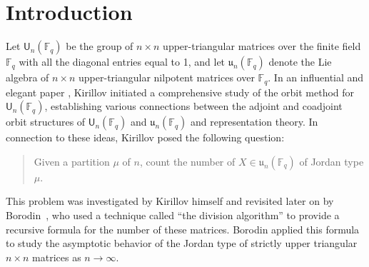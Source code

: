 \documentclass[12pt,a4paper,reqno]{amsart}
\theoremstyle{plain}
\theoremstyle{definition}
\newcommand{\FF}{{\mathbb{F}}}
\newcommand{\1}{\mathds{1}}
\newcommand{\GL}{\mathrm{GL}}
\renewcommand{\u}{\mathfrak{u}}
\newcommand{\U}{\mathsf{U}}
\begin{document}
\begin{abstract}
We give three applications of our main result stated above. 
First, we obtain an analogous formula for the number of points of a nilpotent Hessenberg variety. 
Second, we give an explicit formula for the number of  $X\in \u_\Lambda(\FF_q)$ that satisfy $X^2=0$. In the special case $\Lambda=(1^n)$, our formula is different from the one conjectured by Kirillov and Melnikov~\cite{KirillovMelnikov} (and proved by Ekhad and Zeilberger~\cite{Ekhad}). However, we obtain a new proof of the Kirillov-Melnikov-Ekhad-Zeilberger 
formula
using our latter result and a formula for two-rowed Macdonald polynomials by Jing and J\'{o}zefiak~\cite{Jing}.
As a byproduct, we demonstrate that a recurrence relation of Kirillov in~\cite{KirillovX=0} for the number of strictly upper triangular matrices of Jordan type $\mu$ is a straightforward consequence of our main results combined with the Cauchy identity for Macdonald polynomials.
Third, we give an explicit formula for the number of double cosets $\U_1\backslash\GL_n(\FF_q)/\U_2$ where $\U_1$ and $\U_2$ denote unipotent subgroups of $\GL_n(\FF_q)$ that correspond to two $\mathfrak b_n(\FF_q)$-stable ideals of $\u_n(\FF_q)$. 
\end{abstract}


\section{Introduction}

Let $\U_n(\mathbb{F}_q)$ be the group of $n \times n$ upper-triangular matrices over the finite field $\mathbb{F}_q$ with all the diagonal entries equal to 1, and let $\mathfrak{u}_n(\mathbb{F}_q)$ denote the Lie algebra of $n \times n$ upper-triangular nilpotent matrices over $\mathbb{F}_q$. In an influential and elegant paper 
\cite{Kirillov}, Kirillov initiated a comprehensive study of the orbit method for $\U_n(\mathbb{F}_q)$, establishing various connections between the adjoint and coadjoint orbit structures of 
$\U_n(\mathbb{F}_q)$ and
$\mathfrak{u}_n(\mathbb{F}_q)$ 
and representation theory. 
In connection to these ideas, Kirillov posed the following question:
\medskip
\begin{quote}
Given a partition $\mu$ of $n$, count the number of  $X\in \mathfrak{u}_n(\mathbb{F}_q)$ of Jordan type  $\mu$.
\end{quote}
\medskip

This problem was investigated by Kirillov himself and revisited later on by Borodin~\cite{Borodin}, who used  a technique called  ``the division algorithm'' to provide a recursive formula for the number of these matrices. Borodin applied this formula to study the asymptotic behavior of the Jordan type of strictly upper triangular $n \times n$ matrices as $n \to \infty$. 
\smallskip
\end{document}
